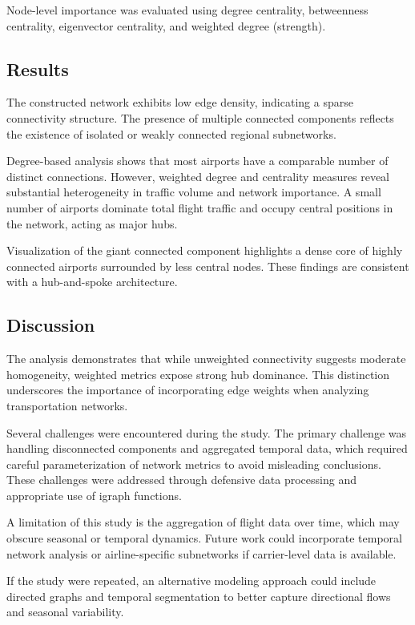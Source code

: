 \documentclass{article}
\begin{document}
Node-level importance was evaluated using degree centrality, betweenness centrality, eigenvector centrality, and weighted degree (strength).

\subsection{Results}

The constructed network exhibits low edge density, indicating a sparse connectivity structure. The presence of multiple connected components reflects the existence of isolated or weakly connected regional subnetworks.

Degree-based analysis shows that most airports have a comparable number of distinct connections. However, weighted degree and centrality measures reveal substantial heterogeneity in traffic volume and network importance. A small number of airports dominate total flight traffic and occupy central positions in the network, acting as major hubs.

Visualization of the giant connected component highlights a dense core of highly connected airports surrounded by less central nodes. These findings are consistent with a hub-and-spoke architecture.

\subsection{Discussion}

The analysis demonstrates that while unweighted connectivity suggests moderate homogeneity, weighted metrics expose strong hub dominance. This distinction underscores the importance of incorporating edge weights when analyzing transportation networks.

Several challenges were encountered during the study. The primary challenge was handling disconnected components and aggregated temporal data, which required careful parameterization of network metrics to avoid misleading conclusions. These challenges were addressed through defensive data processing and appropriate use of igraph functions.

A limitation of this study is the aggregation of flight data over time, which may obscure seasonal or temporal dynamics. Future work could incorporate temporal network analysis or airline-specific subnetworks if carrier-level data is available.

If the study were repeated, an alternative modeling approach could include directed graphs and temporal segmentation to better capture directional flows and seasonal variability.
\end{document}
